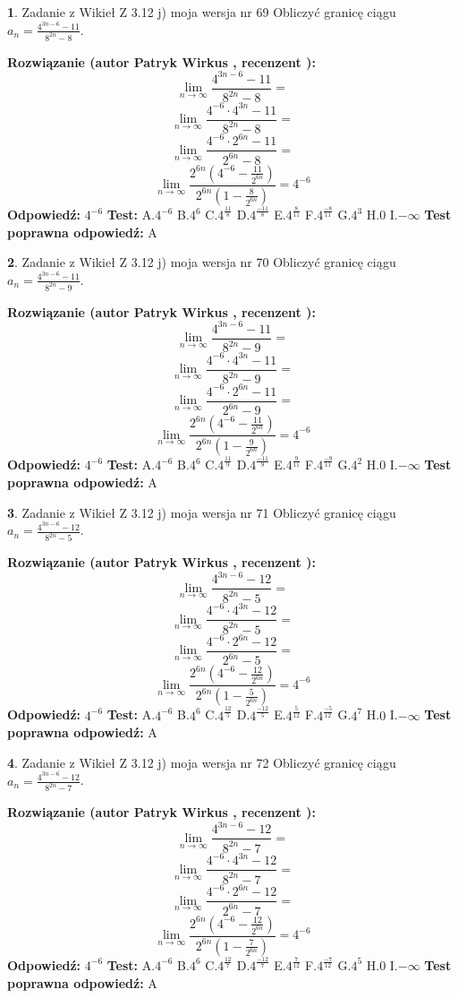 \documentclass[12pt, a4paper]{article}
\theoremstyle{definition} %
\newtheorem{zad}{}
\newcommand{\zadStart}[1]{\begin{zad}#1\newline}
\newcommand{\zadStop}{\end{zad}}
\newcommand{\rozwStart}[2]{\noindent \textbf{Rozwiązanie (autor #1 , recenzent #2): }\newline}
\newcommand{\rozwStop}{\newline}
\newcommand{\odpStart}{\noindent \textbf{Odpowiedź:}\newline}
\newcommand{\odpStop}{\newline}
\newcommand{\testStart}{\noindent \textbf{Test:}\newline}
\newcommand{\testStop}{\newline}
\newcommand{\kluczStart}{\noindent \textbf{Test poprawna odpowiedź:}\newline}
\newcommand{\kluczStop}{\newline}
\begin{document}
\zadStart{Zadanie z Wikieł Z 3.12 j) moja wersja nr 69}
Obliczyć granicę ciągu $a_{n}=\frac{4^{3n-6}-11}{8^{2n}-8}$.
\zadStop
\rozwStart{Patryk Wirkus}{}
$$\lim\limits_{n\to\infty}\frac{4^{3n-6}-11}{8^{2n}-8}=$$
$$\lim\limits_{n\to\infty}\frac{4^{-6} \cdot 4^{3n}-11}{8^{2n}-8}=$$
$$\lim\limits_{n\to\infty}\frac{4^{-6} \cdot 2^{6n}-11}{2^{6n}-8}=$$
$$\lim\limits_{n\to\infty}\frac{2^{6n}(4^{-6} - \frac{11}{2^{6n}})}{2^{6n}(1-\frac{8}{2^{6n}})}= 4^{-6}$$
\rozwStop
\odpStart
$4^{-6}$
\odpStop
\testStart
A.$4^{-6}$
B.$4^{6}$
C.$4^{\frac{11}{8}}$
D.$4^{\frac{-11}{8}}$
E.$4^{\frac{8}{11}}$
F.$4^{\frac{-8}{11}}$
G.$4^{3}$
H.$0$
I.$-\infty$
\testStop
\kluczStart
A
\kluczStop



\zadStart{Zadanie z Wikieł Z 3.12 j) moja wersja nr 70}
Obliczyć granicę ciągu $a_{n}=\frac{4^{3n-6}-11}{8^{2n}-9}$.
\zadStop
\rozwStart{Patryk Wirkus}{}
$$\lim\limits_{n\to\infty}\frac{4^{3n-6}-11}{8^{2n}-9}=$$
$$\lim\limits_{n\to\infty}\frac{4^{-6} \cdot 4^{3n}-11}{8^{2n}-9}=$$
$$\lim\limits_{n\to\infty}\frac{4^{-6} \cdot 2^{6n}-11}{2^{6n}-9}=$$
$$\lim\limits_{n\to\infty}\frac{2^{6n}(4^{-6} - \frac{11}{2^{6n}})}{2^{6n}(1-\frac{9}{2^{6n}})}= 4^{-6}$$
\rozwStop
\odpStart
$4^{-6}$
\odpStop
\testStart
A.$4^{-6}$
B.$4^{6}$
C.$4^{\frac{11}{9}}$
D.$4^{\frac{-11}{9}}$
E.$4^{\frac{9}{11}}$
F.$4^{\frac{-9}{11}}$
G.$4^{2}$
H.$0$
I.$-\infty$
\testStop
\kluczStart
A
\kluczStop



\zadStart{Zadanie z Wikieł Z 3.12 j) moja wersja nr 71}
Obliczyć granicę ciągu $a_{n}=\frac{4^{3n-6}-12}{8^{2n}-5}$.
\zadStop
\rozwStart{Patryk Wirkus}{}
$$\lim\limits_{n\to\infty}\frac{4^{3n-6}-12}{8^{2n}-5}=$$
$$\lim\limits_{n\to\infty}\frac{4^{-6} \cdot 4^{3n}-12}{8^{2n}-5}=$$
$$\lim\limits_{n\to\infty}\frac{4^{-6} \cdot 2^{6n}-12}{2^{6n}-5}=$$
$$\lim\limits_{n\to\infty}\frac{2^{6n}(4^{-6} - \frac{12}{2^{6n}})}{2^{6n}(1-\frac{5}{2^{6n}})}= 4^{-6}$$
\rozwStop
\odpStart
$4^{-6}$
\odpStop
\testStart
A.$4^{-6}$
B.$4^{6}$
C.$4^{\frac{12}{5}}$
D.$4^{\frac{-12}{5}}$
E.$4^{\frac{5}{12}}$
F.$4^{\frac{-5}{12}}$
G.$4^{7}$
H.$0$
I.$-\infty$
\testStop
\kluczStart
A
\kluczStop



\zadStart{Zadanie z Wikieł Z 3.12 j) moja wersja nr 72}
Obliczyć granicę ciągu $a_{n}=\frac{4^{3n-6}-12}{8^{2n}-7}$.
\zadStop
\rozwStart{Patryk Wirkus}{}
$$\lim\limits_{n\to\infty}\frac{4^{3n-6}-12}{8^{2n}-7}=$$
$$\lim\limits_{n\to\infty}\frac{4^{-6} \cdot 4^{3n}-12}{8^{2n}-7}=$$
$$\lim\limits_{n\to\infty}\frac{4^{-6} \cdot 2^{6n}-12}{2^{6n}-7}=$$
$$\lim\limits_{n\to\infty}\frac{2^{6n}(4^{-6} - \frac{12}{2^{6n}})}{2^{6n}(1-\frac{7}{2^{6n}})}= 4^{-6}$$
\rozwStop
\odpStart
$4^{-6}$
\odpStop
\testStart
A.$4^{-6}$
B.$4^{6}$
C.$4^{\frac{12}{7}}$
D.$4^{\frac{-12}{7}}$
E.$4^{\frac{7}{12}}$
F.$4^{\frac{-7}{12}}$
G.$4^{5}$
H.$0$
I.$-\infty$
\testStop
\kluczStart
A
\kluczStop
\end{document}
